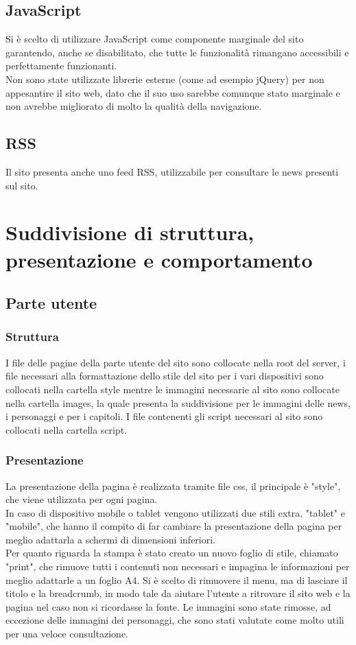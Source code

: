 \documentclass[openany, a4paper, 12pt]{report}
\begin{document}
		\subsection{JavaScript}
		Si è scelto di utilizzare JavaScript come componente marginale del sito garantendo, anche se disabilitato, che tutte le funzionalità rimangano accessibili e perfettamente funzionanti.\\
		Non sono state utilizzate librerie esterne (come ad esempio jQuery) per non appesantire il sito web, dato che il suo uso sarebbe comunque stato marginale e non avrebbe migliorato di molto la qualità della navigazione.
		
		\subsection{RSS}
		Il sito presenta anche uno feed RSS, utilizzabile per consultare le news presenti sul sito.

	\section{Suddivisione di struttura, presentazione e comportamento}
		\subsection{Parte utente}
			\subsubsection{Struttura}
			I file delle pagine della parte utente del sito sono collocate nella root del server, i file necessari alla formattazione dello stile del sito per i vari dispositivi sono collocati nella cartella style mentre le immagini necessarie al sito sono collocate nella cartella images, la quale presenta la suddivisione per le immagini delle news, i personaggi e per i capitoli. I file contenenti gli script necessari al sito sono collocati nella cartella script.
			\subsubsection{Presentazione}
			La presentazione della pagina è realizzata tramite file css, il principale è "style", che viene utilizzata per ogni pagina.\\
			In caso di dispositivo mobile o tablet vengono utilizzati due stili extra, "tablet" e "mobile", che hanno il compito di far cambiare la presentazione della pagina per meglio adattarla a schermi di dimensioni inferiori.\\
			Per quanto riguarda la stampa è stato creato un nuovo foglio di stile, chiamato "print", che rimuove tutti i contenuti non necessari e impagina le informazioni per meglio adattarle a un foglio A4. 			Si è scelto di rimuovere il menu, ma di lasciare il titolo e la breadcrumb, in modo tale da aiutare l'utente a ritrovare il sito web e la pagina nel caso non si ricordasse la fonte. Le immagini sono state rimosse, ad eccezione delle immagini dei personaggi, che sono stati valutate come molto utili per una veloce consultazione.
\end{document}
